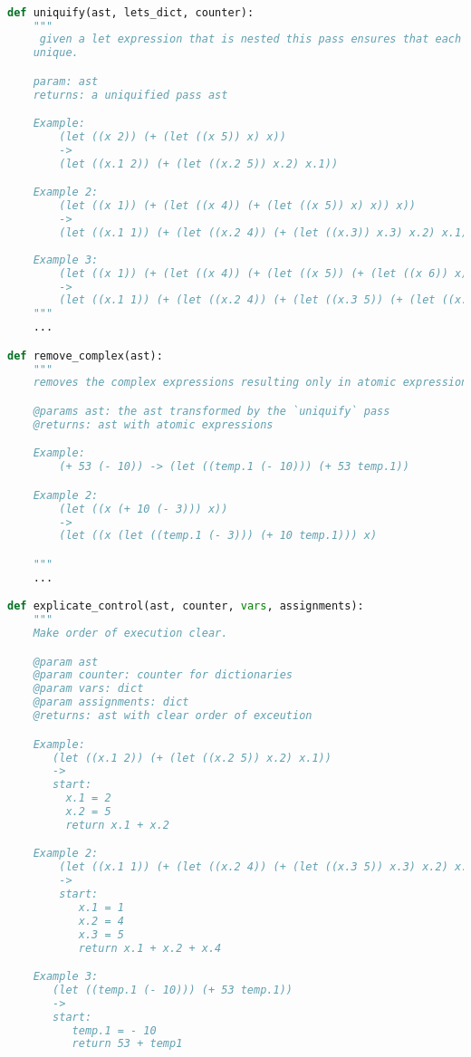 \documentclass{amsbook}
\begin{document}
\begin{lstlisting}[language=python]

def uniquify(ast, lets_dict, counter):
    """ 
     given a let expression that is nested this pass ensures that each var is
    unique.

    param: ast
    returns: a uniquified pass ast

    Example:
        (let ((x 2)) (+ (let ((x 5)) x) x))
        -> 
        (let ((x.1 2)) (+ (let ((x.2 5)) x.2) x.1))

    Example 2:
        (let ((x 1)) (+ (let ((x 4)) (+ (let ((x 5)) x) x)) x))
        ->
        (let ((x.1 1)) (+ (let ((x.2 4)) (+ (let ((x.3)) x.3) x.2) x.1))
    
    Example 3:
        (let ((x 1)) (+ (let ((x 4)) (+ (let ((x 5)) (+ (let ((x 6)) x) x)) x)) x))
        ->
        (let ((x.1 1)) (+ (let ((x.2 4)) (+ (let ((x.3 5)) (+ (let ((x.4 6)) x.4) x.3)) x.2)) x.1))
    """
    ...

def remove_complex(ast):
    """
    removes the complex expressions resulting only in atomic expressions.

    @params ast: the ast transformed by the `uniquify` pass
    @returns: ast with atomic expressions

    Example:
        (+ 53 (- 10)) -> (let ((temp.1 (- 10))) (+ 53 temp.1))

    Example 2:
        (let ((x (+ 10 (- 3))) x))
        ->
        (let ((x (let ((temp.1 (- 3))) (+ 10 temp.1))) x)

    """
    ...

def explicate_control(ast, counter, vars, assignments):
    """
    Make order of execution clear.

    @param ast
    @param counter: counter for dictionaries
    @param vars: dict
    @param assignments: dict
    @returns: ast with clear order of exceution

    Example:
       (let ((x.1 2)) (+ (let ((x.2 5)) x.2) x.1))
       ->
       start:
         x.1 = 2
         x.2 = 5
         return x.1 + x.2

    Example 2:
        (let ((x.1 1)) (+ (let ((x.2 4)) (+ (let ((x.3 5)) x.3) x.2) x.1))
        ->
        start:
           x.1 = 1
           x.2 = 4
           x.3 = 5
           return x.1 + x.2 + x.4

    Example 3:
       (let ((temp.1 (- 10))) (+ 53 temp.1))
       ->
       start:
          temp.1 = - 10
          return 53 + temp1


\end{lstlisting}
\end{document}
